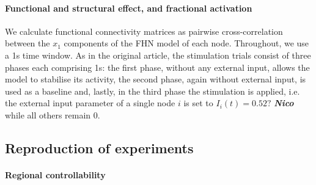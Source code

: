 \paragraph{Functional and structural effect, and fractional activation}
We calculate functional connectivity matrices as pairwise cross-correlation between the $x_1$ components of the FHN model of each node. Throughout, we 
use a 1s time window. As in the original article, the stimulation trials consist of three phases each comprising 1s: the first phase, without any external input, 
allows the model to stabilise its activity, the second phase, again without external input, is used as a baseline and, lastly, in the third phase the stimulation
is applied, i.e. the external input parameter of a single node $i$ is set to $I_i(t)=0.52?$ \textbf{\textit{Nico}} while all others remain 0. 

\subsection{Reproduction of experiments}




\paragraph{Regional controllability}




